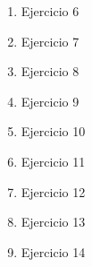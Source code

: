 \documentclass[10pt,letterpaper,fleqn]{article}
\begin{document}
\begin{enumerate}
        \item Ejercicio 6
        \item Ejercicio 7
        \item Ejercicio 8
        \item Ejercicio 9
        \item Ejercicio 10
        \item Ejercicio 11
        \item Ejercicio 12
        \item Ejercicio 13
        \item Ejercicio 14

    \end{enumerate}
\end{document}
